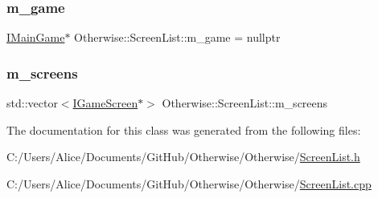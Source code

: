 \subsubsection{\texorpdfstring{m\+\_\+game}{m\_game}}
{\footnotesize\ttfamily \hyperlink{class_otherwise_1_1_i_main_game}{I\+Main\+Game}$\ast$ Otherwise\+::\+Screen\+List\+::m\+\_\+game = nullptr\hspace{0.3cm}{\ttfamily [protected]}}

\mbox{\label{class_otherwise_1_1_screen_list_a3237c433e2a02dc3644b62fe48afdb84}} 
\subsubsection{\texorpdfstring{m\+\_\+screens}{m\_screens}}
{\footnotesize\ttfamily std\+::vector$<$\hyperlink{class_otherwise_1_1_i_game_screen}{I\+Game\+Screen}$\ast$$>$ Otherwise\+::\+Screen\+List\+::m\+\_\+screens\hspace{0.3cm}{\ttfamily [protected]}}



The documentation for this class was generated from the following files\+:\begin{DoxyCompactItemize}
\item 
C\+:/\+Users/\+Alice/\+Documents/\+Git\+Hub/\+Otherwise/\+Otherwise/\hyperlink{_screen_list_8h}{Screen\+List.\+h}\item 
C\+:/\+Users/\+Alice/\+Documents/\+Git\+Hub/\+Otherwise/\+Otherwise/\hyperlink{_screen_list_8cpp}{Screen\+List.\+cpp}\end{DoxyCompactItemize}
